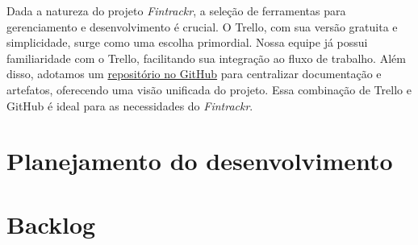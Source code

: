 Dada a natureza do projeto \textit{Fintrackr}, a seleção de ferramentas para gerenciamento e desenvolvimento é crucial. O Trello, com sua versão gratuita e simplicidade, surge como uma escolha primordial. Nossa equipe já possui familiaridade com o Trello, facilitando sua integração ao fluxo de trabalho. Além disso, adotamos um \href{https://github.com/ThiagoSchumann/fintrackr-docs}{repositório no GitHub} para centralizar documentação e artefatos, oferecendo uma visão unificada do projeto. Essa combinação de Trello e GitHub é ideal para as necessidades do \textit{Fintrackr}.

\section{Planejamento do desenvolvimento}
            
\section{Backlog}
